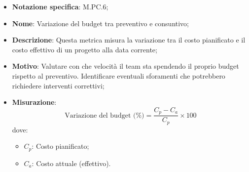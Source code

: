 \begin{itemize}
    \item \textbf{Notazione specifica}: M.PC.6;
    \item \textbf{Nome}: Variazione del budget tra preventivo e consuntivo;
    \item \textbf{Descrizione}: Questa metrica misura la variazione tra il costo pianificato e il costo effettivo di un progetto alla data corrente;
    \item \textbf{Motivo}: Valutare con che velocità il team sta spendendo il proprio budget rispetto al preventivo. Identificare eventuali sforamenti che potrebbero richiedere interventi correttivi;
    \item \textbf{Misurazione}:
    \[
        \text{Variazione del budget (\%)} = \frac{C_p - C_a}{C_p} \times 100
    \]
    dove:
    \begin{itemize}
        \item $C_{p}$: Costo pianificato;
        \item $C_{a}$: Costo attuale (effettivo).
    \end{itemize}
\end{itemize}
